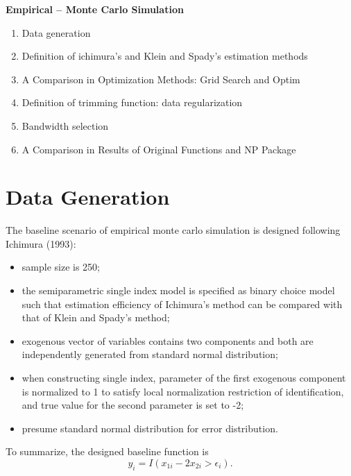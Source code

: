 \documentclass[a4paper]{article}
\begin{document}
\textbf{Empirical -- Monte Carlo Simulation}
\begin{enumerate}
\item Data generation
\item Definition of ichimura's and Klein and Spady's estimation methods
\item A Comparison in Optimization Methods: Grid Search and Optim
\item Definition of trimming function: data regularization
\item Bandwidth selection
\item A Comparison in Results of Original Functions and NP Package


\end{enumerate}
\section{Data Generation}
The baseline scenario of empirical monte carlo simulation is designed following Ichimura (1993): 
\begin{itemize}
\item sample size is 250;
\item the semiparametric single index model is specified as binary choice model such that estimation efficiency of Ichimura's method can be compared with that of Klein and Spady's method;
\item exogenous vector of variables contains two components and both are independently generated from standard normal distribution;
\item when constructing single index, parameter of the first exogenous component is normalized to 1 to satisfy local normalization restriction of identification, and true value for the second parameter is set to -2;
\item presume standard normal distribution for error distribution.
\end{itemize}
To summarize, the designed baseline function is
\begin{equation*}
y_i = I(x_{1i} - 2x_{2i} > \epsilon_i).
\end{equation*}
\end{document}
